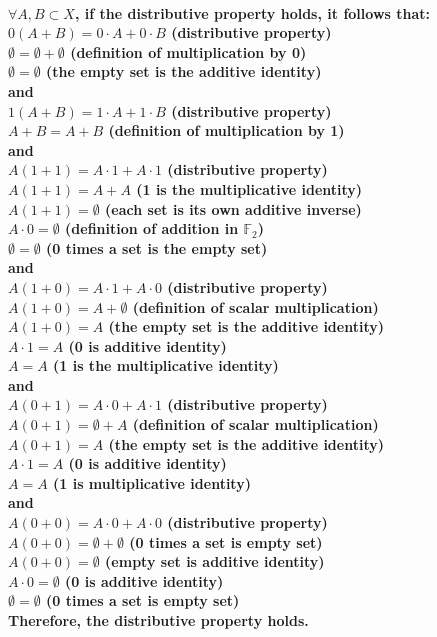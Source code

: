 \documentclass{article}
\begin{document}
\paragraph{\large
\(\forall A, B \subset X\), if the distributive property holds, it follows that:
\\\indent \(0 (A + B) = 0 \cdot A + 0 \cdot B\) (distributive property)
\\\indent \(\emptyset = \emptyset + \emptyset\) (definition of multiplication by 0)
\\\indent \(\emptyset = \emptyset\) (the empty set is the additive identity)
\\and
\\\indent \(1(A + B) = 1 \cdot A + 1 \cdot B\) (distributive property)
\\\indent \(A + B = A + B\) (definition of multiplication by 1)
\\and
\\\indent \(A(1 + 1) = A \cdot 1 + A \cdot 1\) (distributive property)
\\\indent \(A(1 + 1) = A + A\) (1 is the multiplicative identity)
\\\indent \(A(1 + 1) = \emptyset\) (each set is its own additive inverse)
\\\indent \(A \cdot 0 = \emptyset\) (definition of addition in \(\mathds{F}_{2}\))
\\\indent \(\emptyset = \emptyset\) (0 times a set is the empty set)
\\and 
\\\indent \(A(1 + 0) = A \cdot 1 + A \cdot 0\) (distributive property)
\\\indent \(A(1 + 0) = A + \emptyset\) (definition of scalar multiplication)
\\\indent \(A(1 + 0) = A\) (the empty set is the additive identity)
\\\indent \(A \cdot 1 = A\) (0 is additive identity)
\\\indent \(A = A\) (1 is the multiplicative identity)
\\and
\\\indent \(A(0 + 1) = A \cdot 0 + A \cdot 1\) (distributive property)
\\\indent \(A(0 + 1) = \emptyset + A\) (definition of scalar multiplication)
\\\indent \(A(0 + 1) = A\) (the empty set is the additive identity)
\\\indent \(A \cdot 1 = A\) (0 is additive identity)
\\\indent \(A = A\) (1 is multiplicative identity)
\\and
\\\indent \(A(0 + 0) = A \cdot 0 + A \cdot 0\) (distributive property)
\\\indent \(A(0 + 0) = \emptyset + \emptyset\) (0 times a set is empty set)
\\\indent \(A(0 + 0) = \emptyset\) (empty set is additive identity)
\\\indent \(A \cdot 0 = \emptyset\) (0 is additive identity)
\\\indent \(\emptyset = \emptyset\) (0 times a set is empty set)
\\Therefore, the distributive property holds.}
\end{document}
